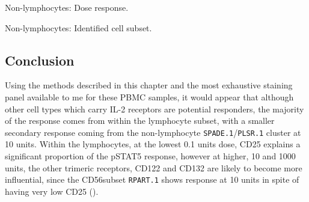 { Non-lymphocytes: Dose response. }
{ }


{ Non-lymphocytes: Identified cell subset. }
{ }


\clearpage


\subsection{Conclusion}

Using the methods described in this chapter and the most exhaustive staining panel available to me for these \gls{PBMC} samples, it would appear that
although other cell types which carry IL-2 receptors are potential responders, the majority of the response comes from within the lymphocyte subset,
with a smaller secondary response coming from the non-lymphocyte \texttt{SPADE.1}/\texttt{PLSR.1} cluster at 10 units.
Within the lymphocytes, at the lowest 0.1 units dose, CD25 explains a significant proportion of the pSTAT5 response,
however at higher, 10 and 1000 units, the other trimeric receptors, CD122 and CD132 are likely to become more influential,
since the CD56\positive subset \texttt{RPART.1} shows response at 10 units in spite of having very low CD25 ().






